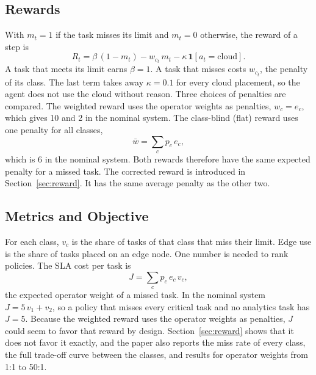 \subsection{Rewards}
With $m_t = 1$ if the task misses its limit and $m_t = 0$ otherwise, the reward of a step is
\begin{equation}
R_t = \beta\,(1-m_t) - w_{c_t}\, m_t - \kappa\,\mathbf{1}[a_t = \text{cloud}].
\label{eq:reward}
\end{equation}
A task that meets its limit earns $\beta = 1$. A task that misses costs $w_{c_t}$, the penalty of its class. The last term takes away $\kappa=0.1$ for every cloud placement, so the agent does not use the cloud without reason. Three choices of penalties are compared. The weighted reward uses the operator weights as penalties, $w_c = e_c$, which gives 10 and 2 in the nominal system. The class-blind (flat) reward uses one penalty for all classes,
\begin{equation}
\bar w = \sum_c p_c\, e_c ,
\label{eq:flat}
\end{equation}
which is 6 in the nominal system. Both rewards therefore have the same expected penalty for a missed task. The corrected reward is introduced in Section~\ref{sec:reward}. It has the same average penalty as the other two.

\subsection{Metrics and Objective}
For each class, $v_c$ is the share of tasks of that class that miss their limit. Edge use is the share of tasks placed on an edge node. One number is needed to rank policies. The SLA cost per task is
\begin{equation}
J = \sum_c p_c\, e_c\, v_c ,
\label{eq:cost}
\end{equation}
the expected operator weight of a missed task. In the nominal system $J = 5\,v_1 + v_2$, so a policy that misses every critical task and no analytics task has $J=5$. Because the weighted reward uses the operator weights as penalties, $J$ could seem to favor that reward by design. Section~\ref{sec:reward} shows that it does not favor it exactly, and the paper also reports the miss rate of every class, the full trade-off curve between the classes, and results for operator weights from 1:1 to 50:1.
